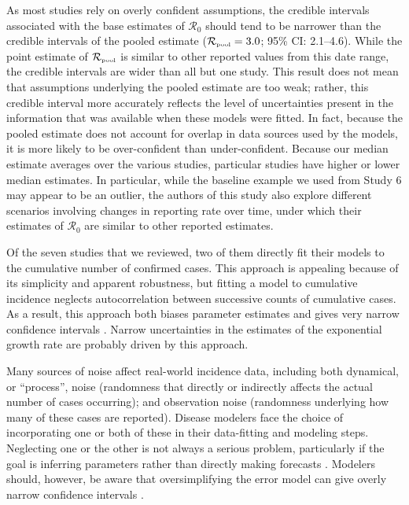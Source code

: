 \documentclass[12pt]{article}
\newcommand{\Ro}{\ensuremath{{\mathcal R}_{0}}\xspace}
\newcommand{\Rpool}{\ensuremath{{\mathcal R}_{\textrm{\tiny{pool}}}}\xspace}
\begin{document}
As most studies rely on overly confident assumptions, the credible intervals associated with the base estimates of \Ro should tend to be narrower than the credible intervals of the pooled estimate ($\Rpool = 3.0$; 95\% CI: 2.1--4.6).
While the point estimate of \Rpool is similar to other reported values from this date range, the credible intervals are wider than all but one study.
This result does not mean that assumptions underlying the pooled estimate are too weak;
rather, this credible interval more accurately reflects the level of uncertainties present in the information that was available when these models were fitted.
In fact, because the pooled estimate does not account for overlap in data sources used by the models, it is more likely to be over-confident than under-confident.
Because our median estimate averages over the various studies, particular studies have higher or lower median estimates.
In particular, while the baseline example we used from Study 6 may appear to be an outlier, the authors of this study also explore different scenarios involving changes in reporting rate over time, under which their estimates of \Ro are similar to other reported estimates.

Of the seven studies that we reviewed, two of them directly fit their models to the cumulative number of confirmed cases.
This approach is appealing because of its simplicity and apparent robustness, but fitting a model to cumulative incidence neglects autocorrelation between successive counts of cumulative cases. 
As a result, this approach both biases parameter estimates and gives very narrow confidence intervals \citep{ma2014estimating, king2015avoidable}.
Narrow uncertainties in the estimates of the exponential growth rate are probably driven by this approach.

Many sources of noise affect real-world incidence data, including both dynamical, or ``process'', noise (randomness that directly or indirectly affects the actual number of cases occurring); and observation noise (randomness underlying how many of these cases are reported).  
Disease modelers face the choice of incorporating one or both of these in their data-fitting and modeling steps. 
Neglecting one or the other is not always a serious problem, particularly if the goal is inferring parameters rather than directly making forecasts \citep{ma2014estimating}.
Modelers should, however, be aware that oversimplifying the error model can give overly narrow confidence intervals \citep{king2015avoidable,taylor2016stochasticity}.
\end{document}
